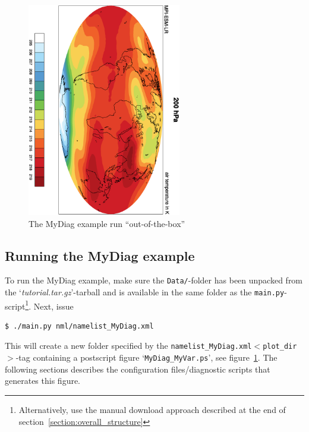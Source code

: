 \documentclass[12pt]{article}
\newcommand{\docref}[1]{`\emph{#1}'}
\newcommand{\xmltag}[1]{\texttt{$<$#1$>$}}
\begin{document}
%
%
\begin{figure}[!ht]
\begin{center}
\includegraphics[width=0.6\textwidth, angle=90]{figures/MyDiag_MyVar.eps}
\caption{The MyDiag example run ``out-of-the-box''}\label{figure:mydiag_myvar}
\end{center}
\end{figure}

\subsection{Running the MyDiag example}\label{subsection:mydiag_testrun}
To run the MyDiag example, make sure the \texttt{Data/}-folder has
been unpacked from the \docref{tutorial.tar.gz}-tarball and is
available in the same folder as the
\texttt{main.py}-script\footnote{Alternatively, use the manual
download approach described at the end of
section~\ref{section:overall_structure}}. Next, issue
\begin{Verbatim}[frame=single, fontsize=\footnotesize]
$ ./main.py nml/namelist_MyDiag.xml
\end{Verbatim}
This will create a new folder specified by the
\texttt{namelist\_MyDiag.xml}\xmltag{plot\_dir}-tag containing a
postscript figure `\texttt{MyDiag\_MyVar.ps}', see
figure~\ref{figure:mydiag_myvar}. The following sections describes the
configuration files/diagnostic scripts that generates this figure. 
\end{document}
